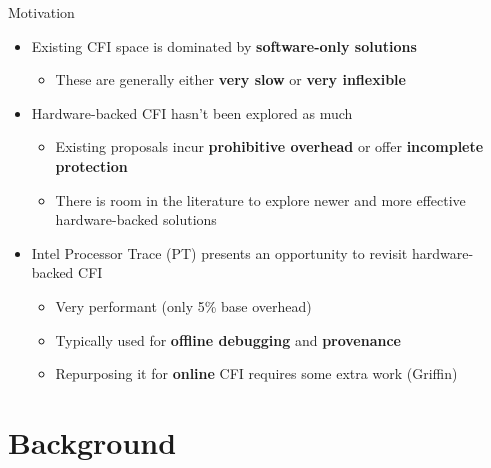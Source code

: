 \documentclass[12pt, dvipsnames, aspectratio=169]{beamer}
\begin{document}
\begin{frame}[c]{Motivation}{}
  \begin{itemize}
    \item Existing CFI space is dominated by {\bf software-only solutions}
    \begin{itemize}
      \item These are generally either {\bf very slow} or {\bf very inflexible}
    \end{itemize}

    \vfill
    \item Hardware-backed CFI hasn't been explored as much
    \begin{itemize}
      \item Existing proposals incur {\bf prohibitive overhead} or offer {\bf incomplete protection}
      \item There is room in the literature to explore newer and more effective hardware-backed solutions
    \end{itemize}

    \vfill
    \item Intel Processor Trace (PT) presents an opportunity to revisit hardware-backed CFI
    \begin{itemize}
      \item Very performant (only 5\% base overhead)
      \item Typically used for {\bf offline debugging} and {\bf provenance}
      \item Repurposing it for {\bf online} CFI requires some extra work (Griffin)
    \end{itemize}
  \end{itemize}
\end{frame}

\section{Background}
\end{document}
